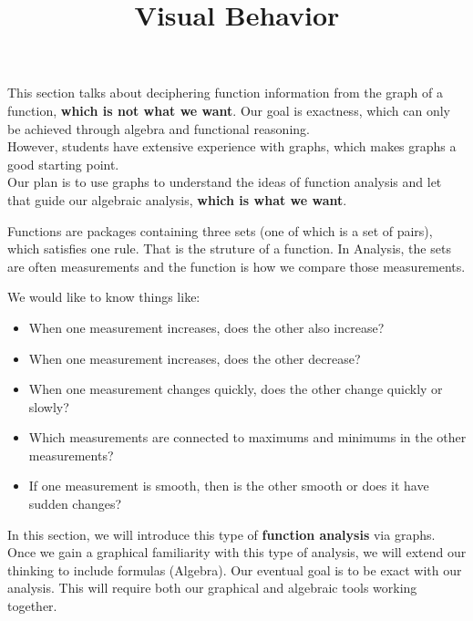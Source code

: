\documentclass{ximera}
\title{Visual Behavior}
\begin{document}
\begin{abstract}
\end{abstract}
\maketitle





\begin{warning}


This section talks about deciphering function information from the graph of a function, \textbf{\textcolor{red!80!black}{which is not what we want}}.  Our goal is exactness, which can only be achieved through algebra and functional reasoning.\\

However, students have extensive experience with graphs, which makes graphs a good starting point. \\

Our plan is to use graphs to understand the ideas of function analysis and let that guide our algebraic analysis, \textbf{\textcolor{red!80!black}{which is what we want}}.

\end{warning}





Functions are packages containing three sets (one of which is a set of pairs), which satisfies one rule.  That is the struture of a function.  In Analysis, the sets are often measurements and the function is how we compare those measurements.

We would like to know things like:

\begin{itemize}
\item When one measurement increases, does the other also increase?
\item When one measurement increases, does the other decrease?
\item When one measurement changes quickly, does the other change quickly or slowly?
\item Which measurements are connected to maximums and minimums in the other measurements?
\item If one measurement is smooth, then is the other smooth or does it have sudden changes?
\end{itemize}


In this section, we will introduce this type of \textbf{function analysis} via graphs. Once we gain a graphical familiarity with this type of analysis, we will extend our thinking to include formulas (Algebra).  Our eventual goal is to be exact with our analysis.  This will require both our graphical and algebraic tools working together.
\end{document}
